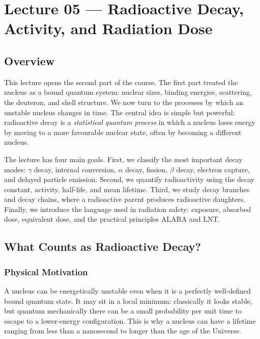 
\section{Lecture 05 — Radioactive Decay, Activity, and Radiation Dose}
\label{sec:lec05}
\date{12 May 2026}

\subsection*{Overview}
This lecture opens the second part of the course.  The first part treated the
nucleus as a bound quantum system: nuclear sizes, binding energies, scattering,
the deuteron, and shell structure.  We now turn to the processes by which an
unstable nucleus changes in time.  The central idea is simple but powerful:
radioactive decay is a \emph{statistical quantum process} in which a nucleus
loses energy by moving to a more favourable nuclear state, often by becoming a
different nucleus.

The lecture has four main goals.  First, we classify the most important decay
modes: $\gamma$ decay, internal conversion, $\alpha$ decay, fission, $\beta$
decay, electron capture, and delayed particle emission.  Second, we quantify
radioactivity using the decay constant, activity, half-life, and mean lifetime.
Third, we study decay branches and decay chains, where a radioactive parent
produces radioactive daughters.  Finally, we introduce the language used in
radiation safety: exposure, absorbed dose, equivalent dose, and the practical
principles ALARA and LNT.

\subsection{What Counts as Radioactive Decay?}
\label{subsec:lec05:definition}

\subsubsection*{Physical Motivation}
A nucleus can be energetically unstable even when it is a perfectly well-defined
bound quantum state.  It may sit in a local minimum: classically it looks stable,
but quantum mechanically there can be a small probability per unit time to
escape to a lower-energy configuration.  This is why a nucleus can have a
lifetime ranging from less than a nanosecond to longer than the age of the
Universe.

